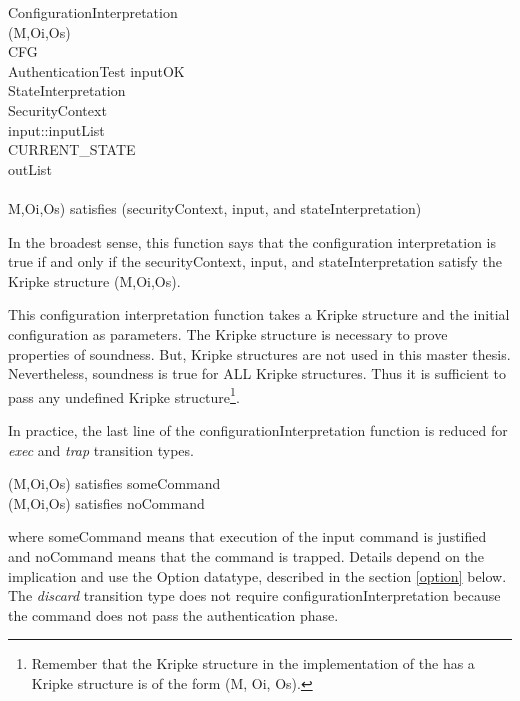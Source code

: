 \documentclass[../../main/main.tex]{subfiles}
\begin{document}
ConfigurationInterpretation\\
\hspace{1cm}(M,Oi,Os)\\
\hspace{1cm}CFG\\
\hspace{2cm}AuthenticationTest inputOK\\
\hspace{2cm}StateInterpretation \\
\hspace{2cm}SecurityContext\\
\hspace{2cm}input::inputList\\
\hspace{2cm}CURRENT_STATE\\
\hspace{2cm}outList\\
\hspace{1cm}\HOLSymConst{\HOLTokenEquiv{}}\\
\hspace{1cm} M,Oi,Os) satisfies (securityContext, input, and stateInterpretation)

In the broadest sense, this function says that the configuration interpretation is true if and only if the securityContext, input, and stateInterpretation satisfy the Kripke structure (M,Oi,Os).  

This configuration interpretation function takes a Kripke structure and the initial configuration as parameters. The Kripke structure is necessary to prove properties of soundness.  But, Kripke structures are not used in this master thesis.  Nevertheless, soundness is true for ALL Kripke structures.  Thus it is sufficient to pass any undefined Kripke structure\footnote{Remember that the Kripke structure in the  implementation of the  has a Kripke structure is of the form (M, Oi, Os).}.  

In practice, the last line of the configurationInterpretation function is reduced for \textit{exec} and \textit{trap} transition types.

\hspace{1cm} (M,Oi,Os) satisfies someCommand\\
\hspace{1cm} (M,Oi,Os) satisfies noCommand

where someCommand means that execution of the input command is justified and noCommand means that the command is trapped.  Details depend on the implication and use the Option datatype, described in the section \ref{option} below.  The \textit{discard} transition type does not require configurationInterpretation because the command does not pass the authentication phase.
\end{document}
